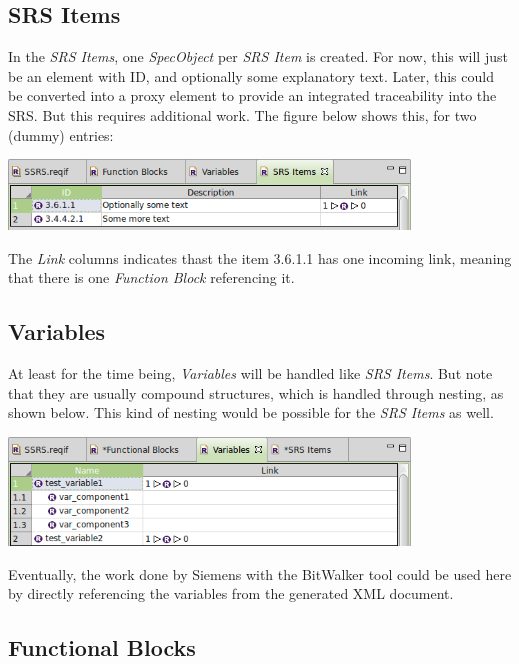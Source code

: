 \documentclass{template/openetcs_article}
\begin{document}
\subsection{SRS Items}

In the \emph{SRS Items}, one \emph{SpecObject} per \emph{SRS Item} is created.  For now, this will just be an element with ID, and optionally some explanatory text.  Later, this could be converted into a proxy element to provide an integrated traceability into the SRS.  But this requires additional work.  The figure below shows this, for two (dummy) entries:

\begin{center}
\includegraphics[width=0.8\textwidth]{img/srs-items.png}
\end{center}

The \emph{Link} columns indicates thast the item 3.6.1.1 has one incoming link, meaning that there is one \emph{Function Block} referencing it.

\subsection{Variables}

At least for the time being, \emph{Variables} will be handled like \emph{SRS Items}.  But note that they are usually compound structures, which is handled through nesting, as shown below.  This kind of nesting would be possible for the \emph{SRS Items} as well.

\begin{center}
\includegraphics[width=0.8\textwidth]{img/variables.png}
\end{center}

Eventually, the work done by Siemens with the BitWalker tool could be used here by directly referencing the variables from the generated XML document.

\subsection{Functional Blocks}
\end{document}
